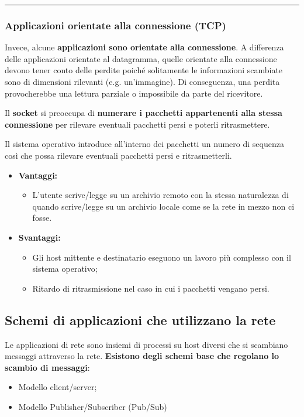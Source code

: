 \documentclass[a4paper]{article}
\newcommand{\longline}{\noindent\rule{\textwidth}{0.4pt}}
\begin{document}
	\longline
	
	\subsubsection{Applicazioni orientate alla connessione (TCP)}
	
	Invece, alcune \textbf{applicazioni sono orientate alla connessione}. A differenza delle applicazioni orientate al datagramma, quelle orientate alla connessione devono tener conto delle perdite poiché solitamente le informazioni scambiate sono di dimensioni rilevanti (e.g. un'immagine). Di conseguenza, una perdita provocherebbe una lettura parziale o impossibile da parte del ricevitore.\newline
	
	\noindent
	Il \textbf{socket} si preoccupa di \textbf{numerare i pacchetti appartenenti alla stessa connessione} per rilevare eventuali pacchetti persi e poterli ritrasmettere.\newline
	
	\noindent
	Il sistema operativo introduce all'interno dei pacchetti un numero di sequenza così che possa rilevare eventuali pacchetti persi e ritrasmetterli.
	\begin{itemize}
		\item \textcolor{Green4}{\textbf{Vantaggi:}}
		\begin{itemize}
			\item L'utente scrive/legge su un archivio remoto con la stessa naturalezza di quando scrive/legge su un archivio locale come se la rete in mezzo non ci fosse.
		\end{itemize}
		
		\item \textcolor{Red3}{\textbf{Svantaggi:}}
		\begin{itemize}
			\item Gli host mittente e destinatario eseguono un lavoro più complesso con il sistema operativo;
			\item Ritardo di ritrasmissione nel caso in cui i pacchetti vengano persi.
		\end{itemize}
	\end{itemize}\newpage

	\subsection{Schemi di applicazioni che utilizzano la rete}
	
	Le applicazioni di rete sono insiemi di processi su host diversi che si scambiano messaggi attraverso la rete. \textbf{Esistono degli schemi base che regolano lo scambio di messaggi}:
	\begin{itemize}
		\item Modello client/server;
		\item Modello Publisher/Subscriber (Pub/Sub)
	\end{itemize}
\end{document}
